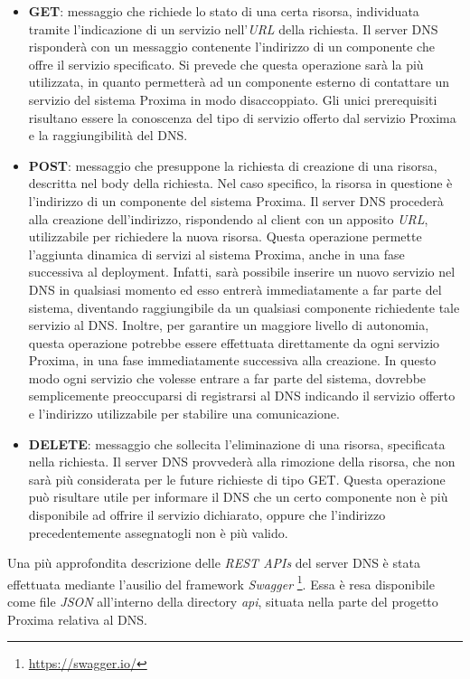 \documentclass[a4paper,12pt]{report}
\begin{document}
\begin{itemize}
	\item \textbf{GET}: messaggio che richiede lo stato di una certa risorsa, individuata tramite l'indicazione di un servizio nell'\emph{URL} della richiesta. Il server DNS risponderà con un messaggio contenente l'indirizzo di un componente che offre il servizio specificato. \newline Si prevede che questa operazione sarà la più utilizzata, in quanto permetterà ad un componente esterno di contattare un servizio del sistema Proxima in modo disaccoppiato. Gli unici prerequisiti risultano essere la conoscenza del tipo di servizio offerto dal servizio Proxima e la raggiungibilità del DNS.
	\item \textbf{POST}: messaggio che presuppone la richiesta di creazione di una risorsa, descritta nel body della richiesta. Nel caso specifico, la risorsa in questione è l'indirizzo di un componente del sistema Proxima. Il server DNS procederà alla creazione dell'indirizzo, rispondendo al client con un apposito \emph{URL}, utilizzabile per richiedere la nuova risorsa. \newline Questa operazione permette l'aggiunta dinamica di servizi al sistema Proxima, anche in una fase successiva al deployment. Infatti, sarà possibile inserire un nuovo servizio nel DNS in qualsiasi momento ed esso entrerà immediatamente a far parte del sistema, diventando raggiungibile da un qualsiasi componente richiedente tale servizio al DNS. Inoltre, per garantire un maggiore livello di autonomia, questa operazione potrebbe essere effettuata direttamente da ogni servizio Proxima, in una fase immediatamente successiva alla creazione. In questo modo ogni servizio che volesse entrare a far parte del sistema, dovrebbe semplicemente preoccuparsi di registrarsi al DNS indicando il servizio offerto e l'indirizzo utilizzabile per stabilire una comunicazione.
	\item \textbf{DELETE}: messaggio che sollecita l'eliminazione di una risorsa, specificata nella richiesta. Il server DNS provvederà alla rimozione della risorsa, che non sarà più considerata per le future richieste di tipo GET. \newline Questa operazione può risultare utile per informare il DNS che un certo componente non è più disponibile ad offrire il servizio dichiarato, oppure che l'indirizzo precedentemente assegnatogli non è più valido.
\end{itemize}
Una più approfondita descrizione delle \emph{REST APIs} del server DNS è stata effettuata mediante l'ausilio del framework \emph{Swagger} \footnote{\url{https://swagger.io/}}. Essa è resa disponibile come file \emph{JSON} all'interno della directory \emph{api}, situata nella parte del progetto Proxima relativa al DNS.
\end{document}

